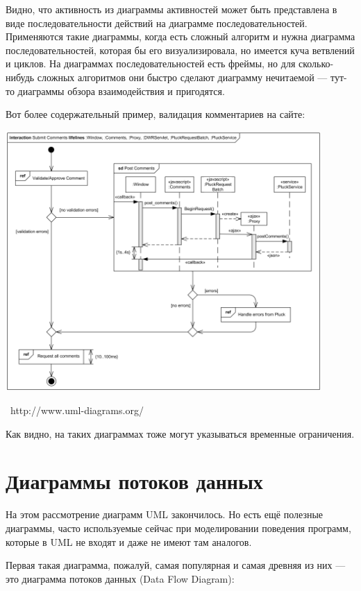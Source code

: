 \documentclass[a5paper]{article}
\newcommand{\attribution}[1] {
    \vspace{-5mm}\begin{flushright}\begin{scriptsize}%
    {\textcopyright\, #1}\end{scriptsize}\end{flushright}
}
\begin{document}
Видно, что активность из диаграммы активностей может быть представлена в виде последовательности действий на диаграмме последовательностей. Применяются такие диаграммы, когда есть сложный алгоритм и нужна диаграмма последовательностей, которая бы его визуализировала, но имеется куча ветвлений и циклов. На диаграммах последовательностей есть фреймы, но для сколько-нибудь сложных алгоритмов они быстро сделают диаграмму нечитаемой --- тут-то диаграммы обзора взаимодействия и пригодятся. 

Вот более содержательный пример, валидация комментариев на сайте:

\begin{center}
    \includegraphics[width=0.9\textwidth]{interactionOverviewExample.png}
    \attribution{http://www.uml-diagrams.org/}
\end{center}

Как видно, на таких диаграммах тоже могут указываться временные ограничения.

\section{Диаграммы потоков данных}

На этом рассмотрение диаграмм UML закончилось. Но есть ещё полезные диаграммы, часто используемые сейчас при моделировании поведения программ, которые в UML не входят и даже не имеют там аналогов. 

Первая такая диаграмма, пожалуй, самая популярная и самая древняя из них --- это диаграмма потоков данных (Data Flow Diagram):
\end{document}
